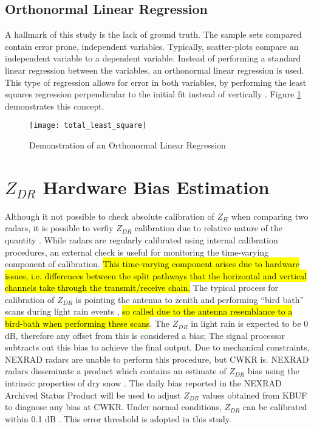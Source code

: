 \subsection{Orthonormal Linear Regression}
A hallmark of this study is the lack of ground truth. The sample sets compared contain error prone, independent variables. Typically, scatter-plots compare
an independent variable to a dependent variable. Instead of performing a standard linear regression between the variables, an orthonormal linear regression
is used. This type of regression allows for error in both variables, by performing the least squares regression perpendicular to the initial fit instead of
vertically \citep{Markovsky2007}. Figure \ref{fig:total_least_squares} demonstrates this concept.
\begin{figure}[H]
\texttt{[image: total\_least\_square]}\centering
\caption{Demonstration of an Orthonormal Linear Regression} 
\label{fig:total_least_squares}
\end{figure}
\section{$Z_{DR}$ Hardware Bias Estimation}
Although it not possible to check absolute calibration of $Z_{H}$ when comparing two radars, it is possible to verfiy $Z_{DR}$ calibration due to relative
nature of the quantity \citep{Zrnic2006}. While radars are regularly calibrated using internal calibration procedures, an external check is useful for
monitoring the time-varying component of calibration. \hl{This time-varying component arises due to hardware issues, i.e. differences between the split pathways that the horizontal and vertical channels take through the transmit/receive chain.} The typical process for calibration of $Z_{DR}$ is pointing the antenna to zenith and performing ``bird
bath'' scans during light rain events \citep{Hubbert2006}, \hl{so called due to the antenna resemblance to a bird-bath when performing these scans}. The $Z_{DR}$ in light rain is expected to be 0 dB, therefore any offset from this is considered a
bias; The signal processor subtracts out this bias to achieve the final output. Due to mechanical constraints, NEXRAD radars are unable to perform this
procedure, but CWKR is. NEXRAD radars disseminate a product which contains an estimate of $Z_{DR}$ bias using the intrinsic properties of
dry snow \cite{Zittel2015}. The daily bias reported in the NEXRAD Archived Status Product will be used to adjust $Z_{DR}$ values obtained from KBUF to diagnose any bias at CWKR. Under normal conditions, $Z_{DR}$ can be calibrated within 0.1 dB \citep{Zrnic2006}. This error threshold is adopted in this study.